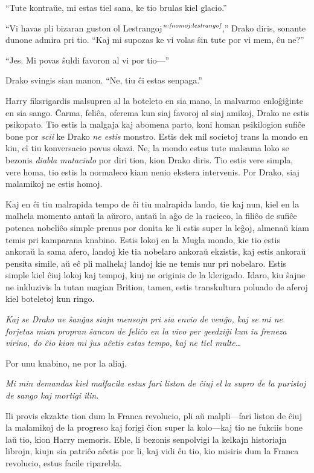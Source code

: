 ``Tute kontraŭe, mi estas tiel sana, ke tio brulas kiel glacio.''

``Vi havas pli bizaran guston ol Lestrangoj$^{\textit{n:\ref{nomoj:lestrango}}}$,''
Drako diris, sonante dunone admira pri tio. ``Kaj mi supozas ke vi
volas ŝin tute por vi mem, ĉu ne?''

``Jes. Mi povas ŝuldi favoron al vi por tio—''

Drako svingis sian manon. ``Ne, tiu ĉi estas senpaga.''

Harry fiksrigardis malsupren al la boteleto en sia mano, la malvarmo
enloĝiĝinte en sia sango. Ĉarma, feliĉa, oferema kun siaj favoroj al
siaj amikoj, Drako ne estis psikopato. Tio estis la malgaja kaj
abomena parto, koni homan psikilogion sufiĉe bone por \emph{scii} ke
Drako \emph{ne estis} monstro. Estis dek mil societoj trans la mondo
en kiu, cî tiu konversacio povus okazi. Ne, la mondo estus tute
malsama loko se bezonis \emph{diabla mutaciulo} por diri tion, kion
Drako diris. Tio estis vere simpla, vere homa, tio estis la normaleco
kiam nenio ekstera intervenis. Por Drako, siaj malamikoj ne estis homoj.

Kaj en ĉi tiu malrapida tempo de ĉi tiu malrapida lando, tie kaj nun,
kiel en la malhela momento antaŭ la aŭroro, antaŭ la aĝo de la
racieco, la filiĉo de sufiĉe potenca nobeliĉo simple prenus por donita
ke li estis super la leĝoj, almenaŭ kiam temis pri kamparana
knabino. Estis lokoj en la Mugla mondo, kie tio estis ankoraŭ la sama
afero, landoj kie tia nobelaro ankoraŭ ekzistis, kaj estis ankoraŭ
pensita simile, aŭ eĉ pli malhelaj landoj kie ne temis nur pri
nobelaro. Estis simple kiel ĉiuj lokoj kaj tempoj, kiuj ne originis de
la klerigado. Idaro, kiu ŝajne ne inkluzivis la tutan magian Brition,
tamen, estis transkultura poluado de aferoj kiel boteletoj kun ringo.

\emph{Kaj se Drako ne ŝanĝas siajn mensojn pri sia envio de venĝo, kaj
  se mi ne forĵetas mian propran ŝancon de feliĉo en la vivo per
  geedziĝi kun iu freneza virino, do ĉio kion mi ĵus aĉetis estas
  tempo, kaj ne tiel multe\ldots}

Por unu knabino, ne por la aliaj.

\emph{Mi min demandas kiel malfacila estus fari liston de ĉiuj el la
  supro de la puristoj de sango kaj mortigi ilin.}

Ili provis ekzakte tion dum la Franca revolucio, pli aŭ malpli—fari
liston de ĉiuj la malamikoj de la progreso kaj forigi ĉion super la
kolo—kaj tio ne fukciis bone laŭ tio, kion Harry memoris. Eble, li
bezonis senpolvigi la kelkajn historiajn librojn, kiujn sia patriĉo
aĉetis por li, kaj vidi ĉu tio, kio misiris dum la Franca revolucio,
estus facile riparebla.

